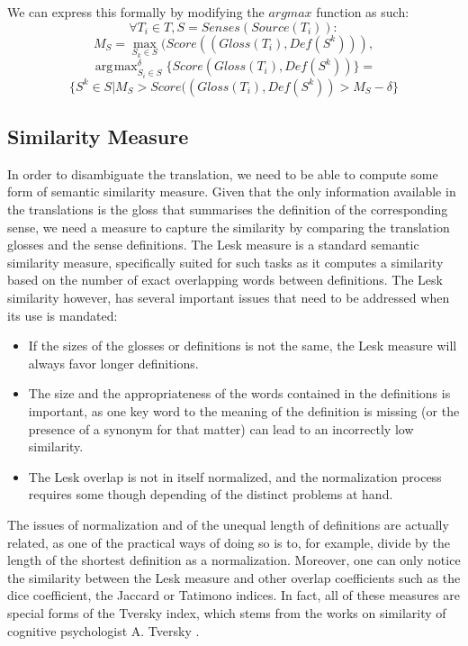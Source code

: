 \documentclass[10pt,a4paper,twoside]{article}
\DeclareMathOperator*{\argmax}{arg\!\max}
\begin{document}
We can express this formally by modifying the \(argmax\) function as such:
\[
\forall T_i \in T, S=Senses(Source(T_i)): 
\]
\[
M_S = \max_{S_k\in S}(Score((Gloss(T_i),Def(S^k))),
\]
\[
\argmax_{S_i\in S}^\delta \{Score(Gloss(T_i),Def(S^k))\}=
\]
\[
\{S^k\in S|  M_S > Score((Gloss(T_i),Def(S^k)) > M_S-\delta \}
\]

\subsection{Similarity Measure}
In order to disambiguate the translation, we need to be able to compute some form of semantic similarity measure. Given that the only information available in the translations is the gloss that summarises the definition of the corresponding sense, we need a measure to capture the similarity by comparing the translation glosses and the sense definitions. The Lesk \cite{citeulike:625530} measure is a standard semantic similarity measure, specifically suited for such tasks as it computes a similarity based on the number of exact overlapping words between definitions. The Lesk similarity however, has several important issues that need to be addressed when its use is mandated: 
\begin{itemize}
	\item If the sizes of the glosses or definitions is not the same, the Lesk measure will always favor longer definitions.
	\item The size and the appropriateness of the words contained in the definitions is important, as one key word to the meaning of the definition is missing (or the presence of a synonym for that matter) can lead to an incorrectly low similarity.
	\item The Lesk overlap is not in itself normalized, and the normalization process requires some though depending of the distinct problems at hand.
\end{itemize}
 
 The issues of normalization and of the unequal length of definitions are actually related, as one of the practical ways of doing so is to, for example, divide by the length of the shortest definition as a normalization. Moreover, one can only notice the similarity between the Lesk measure and other overlap coefficients such as the dice coefficient, the Jaccard or Tatimono indices. In fact, all of these measures are special forms of the Tversky index, which stems from the works on similarity of cognitive psychologist A. Tversky \cite{tversky77similarity}.
\end{document}
